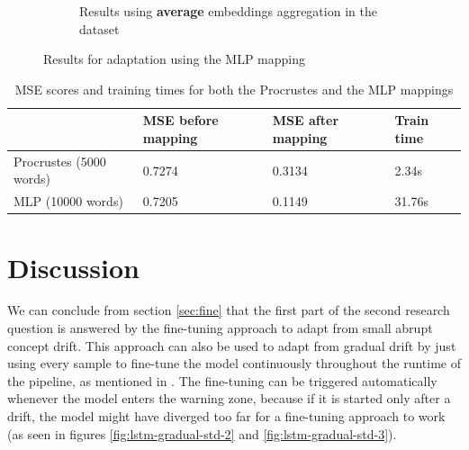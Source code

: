 \documentclass[12pt]{extreport}
\begin{document}
\begin{figure}[H]
\begin{subfigure}{.49\textwidth}
\caption{Results using \textbf{average} embeddings aggregation in the dataset}
\label{fig:mlp-average}
\end{subfigure}
\caption{Results for adaptation using the MLP mapping}
\label{fig:mlp-results}
\end{figure}

\begin{table}[H]
\centering
\begin{tabular}{|l|l|l|l|}
\hline
                  & MSE before mapping & MSE after mapping & Train time \\ \hline
Procrustes (5000 words) & 0.7274             & 0.3134            & 2.34s      \\ \hline
MLP (10000 words)       & 0.7205             & 0.1149            & 31.76s     \\ \hline
\end{tabular}
\caption{MSE scores and training times for both the Procrustes and the MLP mappings}
\label{table:maps}
\end{table}

\section{Discussion}

We can conclude from section \ref{sec:fine} that the first part of the second research question is answered by the fine-tuning approach to adapt from small abrupt concept drift. This approach can also be used to adapt from gradual drift by just using every sample to fine-tune the model continuously throughout the runtime of the pipeline, as mentioned in \cite{fine-tuning-cd-image}. The fine-tuning can be triggered automatically whenever the model enters the warning zone, because if it is started only after a drift, the model might have diverged too far for a fine-tuning approach to work (as seen in figures \ref{fig:lstm-gradual-std-2} and \ref{fig:lstm-gradual-std-3}).
\end{document}
